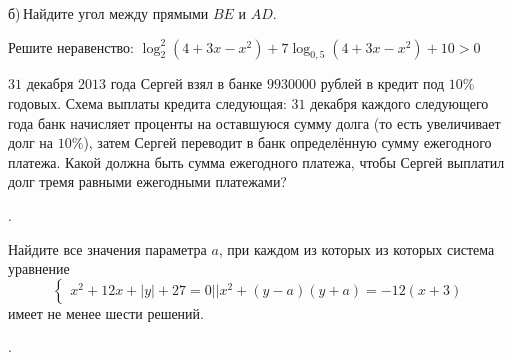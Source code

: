 \begin{training}[2]
\begin{listofex}
		б) Найдите угол между прямыми \( BE \) и \( AD \).
		\item Решите неравенство: \( \log^2_2(4+3x-x^2)+7\log_{0,5}(4+3x-x^2)+10>0 \)
		\item \( 31 \) декабря \( 2013 \) года Сергей взял в банке \( 9 930 000 \) рублей в кредит под \( 10\% \) годовых. Схема выплаты кредита следующая: \( 31 \) декабря каждого следующего года банк начисляет проценты на оставшуюся сумму долга (то есть увеличивает долг на \( 10\% \)), затем Сергей переводит в банк определённую сумму ежегодного платежа. Какой должна быть сумма ежегодного платежа, чтобы Сергей выплатил долг тремя равными ежегодными платежами?
		\item .
		\item Найдите все значения параметра \( a \), при каждом из которых из которых система уравнение
		\[\begin{cases} x^2+12x+|y|+27=0 || x^2+(y-a)(y+a)=-12(x+3) \end{cases}\]
		имеет не менее шести решений.
		\item .
	\end{listofex}
\end{training}
